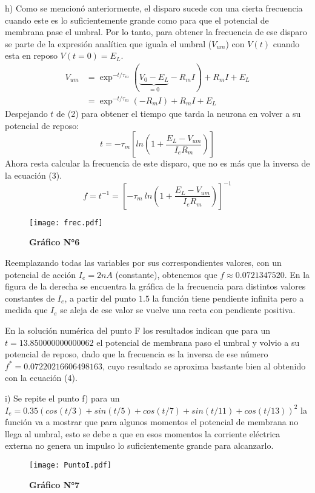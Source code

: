 \documentclass[12pt,a4paper]{article}
\begin{document}
h) Como se mencionó anteriormente, el disparo sucede con una cierta frecuencia cuando este es lo suficientemente grande como para que el potencial de membrana pase el umbral. Por lo tanto, para obtener la frecuencia de ese disparo se parte de la expresión analítica que iguala el umbral ($V_{um}$) con $V(t)$ cuando esta en reposo $V(t=0)=E_L$.
\setcounter{equation}{0}
\begin{align}
V_{um} &= \exp^{-t/ \tau_m}(\underbrace{V_0-E_L}_{=0}-R_mI)+R_mI+E_L \\
&=\exp^{-t/ \tau_m}(-R_mI)+R_mI+E_L
\end{align}
Despejando $t$ de (2) para obtener el tiempo que tarda la neurona en volver a su potencial de reposo:
\begin{equation}
t = -\tau_m \left[ln\left(1+\dfrac{E_L-V_{um}}{I_e R_m}\right)\right]
\end{equation}
Ahora resta calcular la frecuencia de este disparo, que no es más que la inversa de la ecuación (3). 
\begin{equation}
f = t^{-1} = \left[-\tau_m \ ln\left(1+\dfrac{E_L-V_{um}}{I_e R_m}\right)\right]^{-1}
\end{equation}
\begin{wrapfigure}[15]{r}{9cm}
\caption*{\textbf{Gráfico N°6}}
\texttt{[image: frec.pdf]}
\label{frec}
\end{wrapfigure}
Reemplazando todas las variables por sus correspondientes valores, con un potencial de acción $I_e=2nA$ (constante), obtenemos que $f\approx0.0721347520$. En la figura de la derecha se encuentra la gráfica de la frecuencia para distintos valores constantes de $I_e$, a partir del punto $1.5$ la función tiene pendiente infinita pero a medida que $I_e$ se aleja de ese valor se vuelve una recta con pendiente positiva.
\bigskip

En la solución numérica del punto F los resultados indican que para un $t=13.850000000000062$ el potencial de membrana paso el umbral y volvio a su potencial de reposo, dado que la frecuencia es la inversa de ese número $f^*= 0.07220216606498163$, cuyo resultado se aproxima bastante bien al obtenido con la ecuación (4). 
\bigskip

i) Se repite el punto f) para un $I_e=0.35(cos(t/3)+sin(t/5)+cos(t/7)+sin(t/11)+cos(t/13))^2$ la función va a mostrar que para algunos momentos el potencial de membrana no llega al umbral, esto se debe a que en esos momentos la corriente eléctrica externa no genera un impulso lo suficientemente grande para alcanzarlo.

\begin{figure}[h]
\centering
\caption*{\textbf{Gráfico N°7}}
\texttt{[image: PuntoI.pdf]}
\label{PuntoI}
\end{figure}
\end{document}
